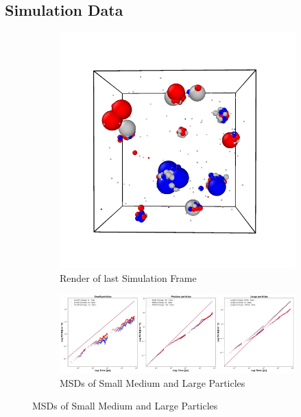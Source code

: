 \documentclass[draft, english]{volcanica-template}
\begin{document}
\subsection{Simulation Data}

\begin{figure}[!htbp]
\centering
\begin{figure}[!htbp]
\centering
\includegraphics[width=0.7\linewidth]{files/LastRender-5d32c7668f5a9b37a6a00d39b10a6ac4.png}
\caption[]{Render of last Simulation Frame}
\label{Fig4}
\end{figure}

\begin{figure}[!htbp]
\centering
\includegraphics[width=0.7\linewidth]{files/Combined_MSD-bec3420f2d761721ebe7507708701ca9.png}
\caption[]{MSDs of Small Medium and Large Particles}
\label{Fig4_SymTestSys-b}
\end{figure}


\end{figure}
\end{document}
